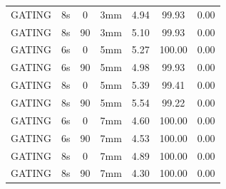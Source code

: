 \documentclass[type=dr, dr=rernat, accentcolor=tud7b,colorbacktitle, bigchapter, openright, twoside, 12pt ]{tudthesis}
\begin{document}
\begin{table}[H]
\begin{tabular}{|c||c|c|c||c|c|c|}
GATING & 8s & 0 & 3mm & 4.94 & 99.93 & 0.00 \\
GATING & 8s & 90 & 3mm & 5.10 & 99.93 & 0.00 \\
GATING & 6s & 0 & 5mm & 5.27 & 100.00 & 0.00 \\
GATING & 6s & 90 & 5mm & 4.98 & 99.93 & 0.00 \\
GATING & 8s & 0 & 5mm & 5.39 & 99.41 & 0.00 \\
GATING & 8s & 90 & 5mm & 5.54 & 99.22 & 0.00 \\
GATING & 6s & 0 & 7mm & 4.60 & 100.00 & 0.00 \\
GATING & 6s & 90 & 7mm & 4.53 & 100.00 & 0.00 \\
GATING & 8s & 0 & 7mm & 4.89 & 100.00 & 0.00 \\
GATING & 8s & 90 & 7mm & 4.30 & 100.00 & 0.00 \\
    \hline\hline 
  \end{tabular}
\end{table}

\newpage
\end{document}
